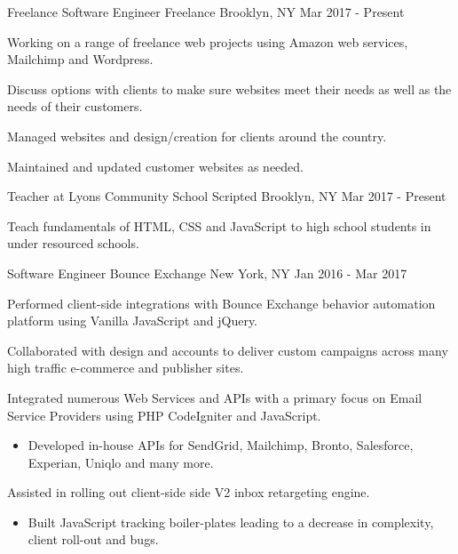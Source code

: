 \begin{cventries}
  \cventry
    {Freelance Software Engineer}
    {Freelance}
    {Brooklyn, NY}
    {Mar 2017 - Present}
    {
      \begin{cvitems}
        \item {Working on a range of freelance web projects using Amazon web services, Mailchimp and Wordpress.}
         \item {Discuss options with clients to make sure websites meet their needs as well as the needs of their customers.}
          \item {Managed websites and design/creation for clients around the country.}
           \item {Maintained and updated customer websites as needed.}
      \end{cvitems}
    }
  \cventry
    {Teacher at Lyons Community School}
    {Scripted}
    {Brooklyn, NY}
    {Mar 2017 - Present}
    {
      \begin{cvitems}
        \item {Teach fundamentals of HTML, CSS and JavaScript to high school students in under resourced schools.}
      \end{cvitems}
    }
  \cventry
    {Software Engineer}
    {Bounce Exchange}
    {New York, NY}
    {Jan 2016 - Mar 2017}
    {
      \begin{cvitems}
        \item {Performed client-side integrations with Bounce Exchange behavior automation platform using Vanilla JavaScript and jQuery.}
        \item{Collaborated with design and accounts to deliver custom campaigns across many high traffic e-commerce and publisher sites.}
        \item{Integrated numerous Web Services and APIs with a primary focus on Email Service Providers using PHP CodeIgniter and JavaScript.}
        \begin{itemize}[leftmargin=5.5mm]
            \item[\bullet] {Developed in-house APIs for SendGrid, Mailchimp, Bronto, Salesforce, Experian, Uniqlo and many more.}
        \end{itemize}
        \item{Assisted in rolling out client-side side V2 inbox retargeting engine.}
        \begin{itemize}[leftmargin=5.5mm]
            \item[\bullet]{Built JavaScript tracking boiler-plates leading to a decrease in complexity, client roll-out and bugs.} 

\end{itemize}
\end{cvitems}}
\end{cventries}
